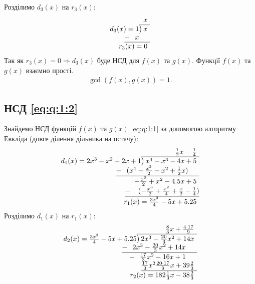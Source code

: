 Розділимо \(d_3(x)\) на \(r_3(x)\):
\begin{gather}
	\begin{array}{r}
		x\phantom{)}   \\
		d_3(x)=1{\overline{\smash{\big)}\,x\phantom{)}}}\\
		\underline{-~\phantom{(}x\phantom{-b)}}\\
		r_3(x)=0\phantom{)}\\ 
	\end{array}
\end{gather}
Так як \(r_3(x)=0\Rightarrow d_3(x)\) буде НСД для \(f(x) \text{ та } g(x)\). Функції \(f(x)\) та \(g(x)\) взаємно прості.
\ansver
\begin{gather}
	\gcd(f(x),g(x))=1.
\end{gather}
\subsection{НСД \eqref{eq:q:1:2}}
\solving
Знайдемо НСД функцій \(f(x)\) та \(g(x)\) \eqref{eq:q:1:1} за допомогою алгоритму Евкліда (довге ділення дільника на остачу):
\begin{gather}
		\begin{array}{r}
		\frac{1}{2}x-\frac{1}{4}\phantom{)}   \\
		d_1(x)=2x^3-x^2-2x+1{\overline{\smash{\big)}\,x^4-x^3-4x+5\phantom{)}}}\\
		\underline{-~\phantom{(}(x^4-\frac{x^3}{2}-x^2+\frac{1}{2}x)\phantom{-b)}}\\
		-\frac{x^3}{2}+x^2-4.5x+5\phantom{)}\\ 
		\underline{-~\phantom{()}(-\frac{x^3}{2}+\frac{x^2}{4}+\frac{x}{2}-\frac{1}{4})}\\ 
		r_1(x)=\frac{3x^2}{4}-5x+5.25\phantom{)}
	\end{array}
\end{gather}
Розділимо \(d_1(x)\) на \(r_1(x)\):
\begin{gather}
	\begin{array}{r}
		\frac{8}{3}x+\frac{4\cdot17}{9}\phantom{)}   \\
		d_2(x)=\frac{3x^2}{4}-5x+5.25{\overline{\smash{\big)}\,2x^3-\frac{20}{3}x^2+14x\phantom{)}}}\\
		\underline{-~\phantom{(}2x^3-\frac{20}{3}x^2+14x\phantom{-b)}}\\
		-~\phantom{(}\frac{17}{3}x^2-16x+1\phantom{-b)}\\
		\underline{\frac{17}{3}x^2\-\frac{20\cdot17}{9}x+39\frac{2}{3}\phantom{)}}\\ 
		r_2(x)=182\frac{1}{3}x-38\frac{2}{3}\phantom{)}
	\end{array}
\end{gather}
